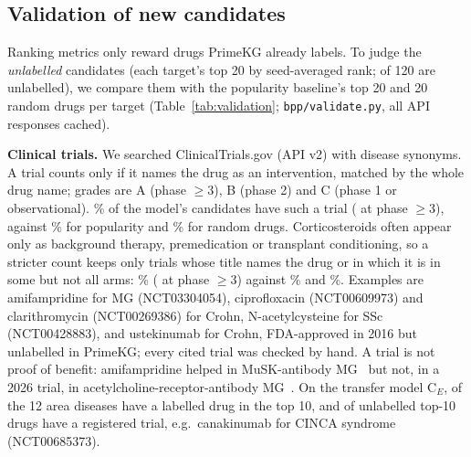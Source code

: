 \documentclass[journal]{IEEEtran}
\begin{document}
\begin{table}[!t]
\centering
\caption{Highest-scoring explanation path for four predictions (seed 0); edge labels are PrimeKG relations ($^{-1}$: inverse direction).}
\label{tab:paths}
\scriptsize

\end{table}

\subsection{Validation of new candidates}
\label{sec:validation}
Ranking metrics only reward drugs PrimeKG already labels. To judge the \emph{unlabelled} candidates (each target's top 20 by seed-averaged rank; \ValNovelN{} of 120 are unlabelled), we compare them with the popularity baseline's top 20 and 20 random drugs per target (Table~\ref{tab:validation}; \texttt{bpp/validate.py}, all API responses cached).

\begin{table}[!t]
\centering
\caption{Evidence for unlabelled candidates: \sysname{} top-20 (Ours, $n$=\ValNovelN) vs.\ popularity top-20 (Pop., $n$=120) vs.\ 20 random drugs per target ($n$=120). Trial grades: A phase $\geq$3, B phase 2, C phase 1 or observational.}
\label{tab:validation}
\scriptsize
\setlength{\tabcolsep}{2.5pt}

\end{table}

\textbf{Clinical trials.} We searched ClinicalTrials.gov (API v2) with disease synonyms. A trial counts only if it names the drug as an intervention, matched by the whole drug name; grades are A (phase $\geq$3), B (phase 2) and C (phase 1 or observational). \ValTrialModel\% of the model's candidates have such a trial (\ValGradeA{} at phase $\geq$3), against \ValTrialPop\% for popularity and \ValTrialRand\% for random drugs. Corticosteroids often appear only as background therapy, premedication or transplant conditioning, so a stricter count keeps only trials whose title names the drug or in which it is in some but not all arms: \ValTrialTestedModel\% (\ValGradeATested{} at phase $\geq$3) against \ValTrialTestedPop\% and \ValTrialTestedRand\%. Examples are amifampridine for MG (NCT03304054), ciprofloxacin (NCT00609973) and clarithromycin (NCT00269386) for Crohn, N-acetylcysteine for SSc (NCT00428883), and ustekinumab for Crohn, FDA-approved in 2016 but unlabelled in PrimeKG; every cited trial was checked by hand. A trial is not proof of benefit: amifampridine helped in MuSK-antibody MG~\cite{bonanno2018amifampridine} but not, in a 2026 trial, in acetylcholine-receptor-antibody MG~\cite{remijn2026amifampridine}. On the transfer model C$_E$, \EcheckDiseases{} of the 12 area diseases have a labelled drug in the top 10, and \EcheckNovelTrial{} of \EcheckNovel{} unlabelled top-10 drugs have a registered trial, e.g.\ canakinumab for CINCA syndrome (NCT00685373).
\end{document}
